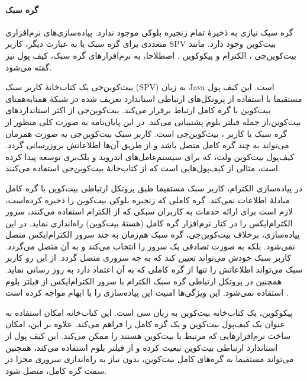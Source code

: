 \paragraph{گره سبک}
گره‌ سبک نیازی به ذخیرهٔ تمام زنجیره بلوکی موجود ندارد. پیاده‌سازی‌های نرم‌افزاری متعددی برای گره سبک یا به عبارت دیگر، کاربر SPV بیت‌کوین وجود دارد. مانند بیت‌کوین‌جی \cite{bitcoinj}، الکترام  
\cite{Electrum}
و پیکوکوین
\cite{Garzik}. 
اصطلاحا، به نرم‌افزار‌های گره سبک، کیف پول نیز گفته می‌شود.

بیت‌کوین‌جی یک کتاب‌خانهٔ کاربر سبک (SPV) به زبان
 \gls{Java}
 است. این کیف پول مستقیما با استفاده از پروتکل‌های ارتباطی استاندارد تعریف شده در شبکهٔ همتا‌به‌همتای بیت‌کوین \cite{P2P_dev,P2P_ref} با گره کامل ارتباط برقرار می‌کند. بیت‌کوین‌جی از اکثر استاندارد‌های بیت‌کوین،‌از جمله فیلتر بلوم \cite{Hearn2013}  پشتیبانی می‌کند. در این پایان‌نامه به صورت کلی منظور از گره سبک یا کاربر ، بیت‌کوین‌جی است. کاربر سبک بیت‌کوین‌جی به صورت همزمان می‌تواند به چند گره کامل متصل باشد و از طریق آن‌ها اطلاعاتش بروزرسانی گردد. کیف‌پول‌ 
بیت‌کوین ولت، که برای سیستم‌عامل‌های اندروید و بلک‌بری توسعه پیدا کرده است، مثالی از کیف‌پول‌هایی است که از کتاب‌خانهٔ بیت‌کوین‌جی استفاده می‌کنند.

در پیاده‌سازی الکترام،‌ کاربر سبک مستقیما طبق پروتکل ارتباطی بیت‌کوین با گره کامل مبادلهٔ اطلاعات نمی‌کند. گره کاملی که زنجیره بلوکی بیت‌کوین را ذخیره کرده‌است،‌ لازم است برای ارائه خدمات به کاربران سبکی که از الکترام استفاده می‌کنند،‌ سرور 
الکترام‌ایکس
\cite{ElectrumX}
را در کنار نرم‌افزار گره کامل (هسته‌ٔ بیت‌کوین) راه‌اندازی نماید. در این پیاده‌سازی، برخلاف بیت‌کوین‌جی، گره سبک هم‌زمان به چند سرور الکترام‌ایکس متصل نمی‌شود. بلکه به صورت تصادفی یک سرور را انتخاب می‌کند و به آن متصل می‌گردد. کاربر سبک خودش می‌تواند تعیین کند که به چه سروری متصل گردد. از این رو کاربر سبک می‌تواند اطلاعاتش را تنها از گره کاملی که به آن اعتماد دارد به روز رسانی نماید.  همچنین در پروتکل ارتباطی گره سبک الکترام با سرور الکترام‌ایکس از فیلتر بلوم استفاده نمی‌شود. این ویژگی‌ها امنیت این پیاده‌سازی را با ابهام مواجه کرده است \cite{Alison2014}. 

پیکوکوین،‌ یک کتاب‌خانه بیت‌کوین به زبان سی است. این کتاب‌خانه امکان استفاده به عنوان یک کیف‌پول بیت‌کوین و یک گره کامل را فراهم می‌کند. علاوه بر این، امکان ساخت نرم‌افزارهایی که مرتبط با بیت‌کوین هستند را ممکن می‌کند. این کیف پول از استاندارد ارتباطی بیت‌کوین تبعیت کرده و از فیلتر بلوم استفاده می‌کند، همچنین می‌تواند مستقیما به گره‌های کامل بیت‌کوین، بدون نیاز به راه‌اندازی سروری مجزا در سمت گره کامل، متصل شود.


